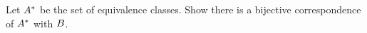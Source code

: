\documentclass[main.tex]{subfiles}
\begin{document}
\subproblem{}\label{s03p04b}

Let \({A^*}\) be the set of equivalence classes. Show there is a
bijective correspondence of \({A^*}\) with \({B}\).

\todo{}
\end{document}
